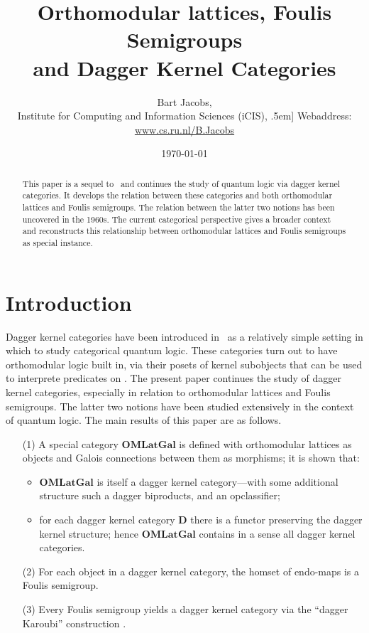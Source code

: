 \documentclass{article}
\title{Orthomodular lattices, Foulis Semigroups \\
       and Dagger Kernel Categories}
\author{Bart Jacobs, \\
{\small Institute for Computing and Information Sciences (iCIS),} \-.5em]
{\small Webaddress: \url{www.cs.ru.nl/B.Jacobs}}}
\date{\small \today}
\newcommand{\Cat}[1]{\ensuremath{\mathbf{#1}}}
\begin{document}
\maketitle

\begin{abstract}
This paper is a sequel to~\cite{HeunenJ09a} and continues the study of
quantum logic via dagger kernel categories. It develops the relation
between these categories and both orthomodular lattices and Foulis
semigroups. The relation between the latter two notions has been
uncovered in the 1960s. The current categorical perspective gives a
broader context and reconstructs this relationship between
orthomodular lattices and Foulis semigroups as special instance.
\end{abstract}


\section{Introduction}\label{IntroSec}

Dagger kernel categories have been introduced in~\cite{HeunenJ09a} as
a relatively simple setting in which to study categorical quantum
logic. These categories turn out to have orthomodular logic built in,
via their posets  of kernel subobjects that can be used to
interprete predicates on .  The present paper continues the study
of dagger kernel categories, especially in relation to orthomodular
lattices and Foulis semigroups. The latter two notions have been
studied extensively in the context of quantum logic. The main results
of this paper are as follows.
\begin{enumerate}
\item[(1)] A special category \Cat{OMLatGal} is defined with
  orthomodular lattices as objects and Galois connections between them
  as morphisms; it is shown that:
\begin{itemize}
\item \Cat{OMLatGal} is itself a dagger kernel category---with some
additional structure such a dagger biproducts, and an opclassifier;

\item for each dagger kernel category \Cat{D} there is a functor
   preserving the dagger kernel
  structure; hence \Cat{OMLatGal} contains in a sense all dagger
  kernel categories.
\end{itemize}

\item[(2)] For each object  in a dagger kernel category, the homset
   of endo-maps is a Foulis semigroup.

\item[(3)] Every Foulis semigroup  yields a dagger kernel category
   via the ``dagger Karoubi'' construction
  .
\end{enumerate}
\end{document}

